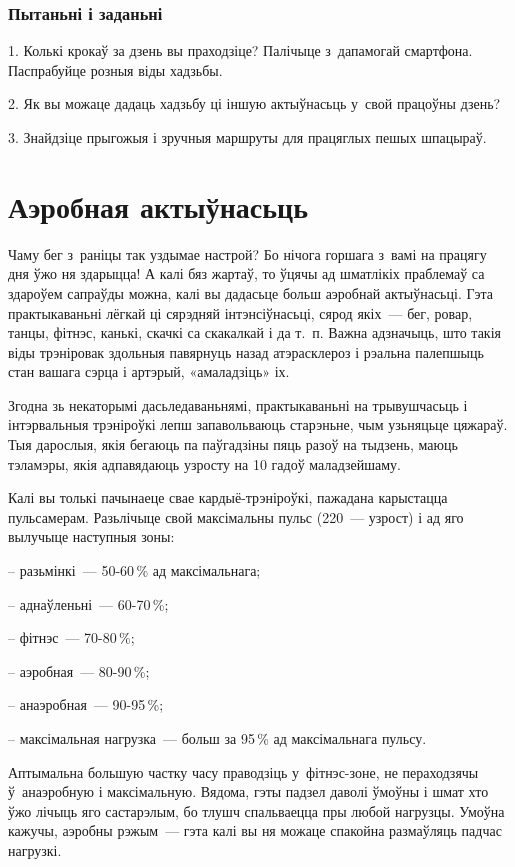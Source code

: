 \subsubsection{Пытаньні і заданьні}

1. Колькі крокаў за дзень вы праходзіце? Палічыце з~дапамогай смартфона. Паспрабуйце розныя віды хадзьбы.

2. Як вы можаце дадаць хадзьбу ці іншую актыўнасьць у~свой працоўны дзень?

3. Знайдзіце прыгожыя і зручныя маршруты для працяглых пешых шпацыраў.


\section{Аэробная актыўнасьць}

Чаму бег з~раніцы так уздымае настрой? Бо нічога горшага з~вамі на працягу дня ўжо ня здарыцца! А калі бяз жартаў, то ўцячы ад шматлікіх праблемаў са здароўем сапраўды можна, калі вы дадасьце больш аэробнай актыўнасьці. Гэта практыкаваньні лёгкай ці сярэдняй інтэнсіўнасьці, сярод якіх~--- бег, ровар, танцы, фітнэс, канькі, скачкі са скакалкай і да т.~п. Важна адзначыць, што такія віды трэніровак здольныя павярнуць назад атэрасклероз і рэальна палепшыць стан вашага сэрца і артэрый, «амаладзіць» іх.

Згодна зь некаторымі дасьледаваньнямі, практыкаваньні на трывушчасьць і інтэрвальныя трэніроўкі лепш запавольваюць старэньне, чым узьняцьце цяжараў. Тыя дарослыя, якія бегаюць па паўгадзіны пяць разоў на тыдзень, маюць тэламэры, якія адпавядаюць узросту на 10 гадоў маладзейшаму.

Калі вы толькі пачынаеце свае кардыё-трэніроўкі, пажадана карыстацца пульсамерам. Разьлічыце свой максімальны пульс (220~--- узрост) і ад яго вылучыце наступныя зоны:

– разьмінкі~--- 50-60\,\% ад максімальнага;

– аднаўленьні~--- 60-70\,\%;

– фітнэс~--- 70-80\,\%;

– аэробная~--- 80-90\,\%;

– анаэробная~--- 90-95\,\%;

– максімальная нагрузка~--- больш за 95\,\% ад максімальнага пульсу.

Аптымальна большую частку часу праводзіць у~фітнэс-зоне, не пераходзячы ў~анаэробную і максімальную. Вядома, гэты падзел даволі ўмоўны і шмат хто ўжо лічыць яго састарэлым, бо тлушч спальваецца пры любой нагрузцы. Умоўна кажучы, аэробны рэжым~--- гэта калі вы ня можаце спакойна размаўляць падчас нагрузкі.

